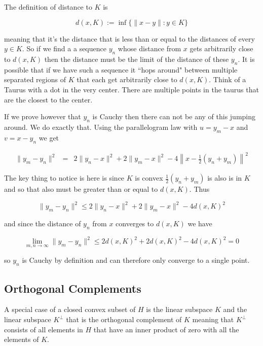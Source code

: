 \documentclass[oneside]{book}
\newenvironment{proof}[1][Proof]{\begin{trivlist}
\item[\hskip \labelsep {\bfseries #1}]}{\end{trivlist}}
\begin{document}
\begin{proof}
The definition of distance to $K$ is

\begin{equation}
d(x,K) := \inf\{\|x-y\|: y \in K \}
\end{equation}

meaning that it's the distance that is less than or equal to the distances of every $y \in K$. So if we find a a sequence $y_n$ whose distance from $x$ gets arbitrarily close to $d(x,K)$ then the distance must be the limit of the distance of these $y_n$. It is possible that if we have such a sequence it ``hops around" between multiple separated regions of $K$ that each get arbitrarily close to $d(x,K)$. Think of a Taurus with a dot in the very center. There are multiple points in the taurus that are the closest to the center.

If we prove however that $y_n$ is Cauchy then there can not be any of this jumping around. We do exactly that. Using the parallelogram law with $u=y_m-x$ and $v=x-y_n$ we get

\begin{eqnarray}
\|y_m-y_n\|^2 &=& 2\|y_n-x\|^2+2\|y_m-x\|^2-4 \left\| x-\frac{1}{2} (y_n+y_m) \right\|^2
\end{eqnarray}

The key thing to notice is here is since $K$ is convex $\frac{1}{2} (y_n+y_m)$ is also is in $K$ and so that also must be greater than or equal to $d(x,K)$. Thus

\begin{equation}
\|y_m-y_n\|^2 \le 2\|y_n-x\|^2+2\|y_m-x\|^2 - 4d(x,K)^2
\end{equation}

and since the distance of $y_n$ from $x$ converges to $d(x,K)$ we have

\begin{equation}
\lim_{m,n\to \infty} \|y_m-y_n\|^2 \le 2d(x,K)^2+2d(x,K)^2 - 4d(x,K)^2 = 0
\end{equation}

so $y_n$ is Cauchy by definition and can therefore only converge to a single point.
\end{proof}


\subsection{Orthogonal Complements}
A special case of a closed convex subset of $H$ is the linear subspace $K$ and the linear subspace $K^\perp$ that is the orthogonal complement of $K$ meaning that $K^\perp$ consists of all elements in $H$ that have an inner product of zero with all the elements of $K$. 
\end{document}
